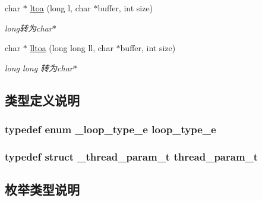 \begin{DoxyCompactItemize}
char $\ast$ \hyperlink{a00082_aaf5ac9c0270bd67e64f697d7fcf5e9ea_aaf5ac9c0270bd67e64f697d7fcf5e9ea}{ltoa} (long l, char $\ast$buffer, int size)
\begin{DoxyCompactList}\small\item\em long转为char$\ast$ \end{DoxyCompactList}\item 
char $\ast$ \hyperlink{a00082_a97f61794357611fc4017112c868420b9_a97f61794357611fc4017112c868420b9}{lltoa} (long long ll, char $\ast$buffer, int size)
\begin{DoxyCompactList}\small\item\em long long 转为char$\ast$ \end{DoxyCompactList}\end{DoxyCompactItemize}


\subsection{类型定义说明}
\hypertarget{a00082_a93730d5de4a5f4dbe3013b02b051df62_a93730d5de4a5f4dbe3013b02b051df62}{}
\subsubsection[{loop\+\_\+type\+\_\+e}]{\setlength{\rightskip}{0pt plus 5cm}typedef enum {\bf \+\_\+loop\+\_\+type\+\_\+e}  {\bf loop\+\_\+type\+\_\+e}}\label{a00082_a93730d5de4a5f4dbe3013b02b051df62_a93730d5de4a5f4dbe3013b02b051df62}
\hypertarget{a00082_aaca514c4c0b391f40ccc7e8c68fd4c21_aaca514c4c0b391f40ccc7e8c68fd4c21}{}
\subsubsection[{thread\+\_\+param\+\_\+t}]{\setlength{\rightskip}{0pt plus 5cm}typedef struct {\bf \+\_\+thread\+\_\+param\+\_\+t}  {\bf thread\+\_\+param\+\_\+t}}\label{a00082_aaca514c4c0b391f40ccc7e8c68fd4c21_aaca514c4c0b391f40ccc7e8c68fd4c21}


\subsection{枚举类型说明}
\hypertarget{a00082_a2583618f1d6afdd0085a96f59b45d9bd_a2583618f1d6afdd0085a96f59b45d9bd}{}
